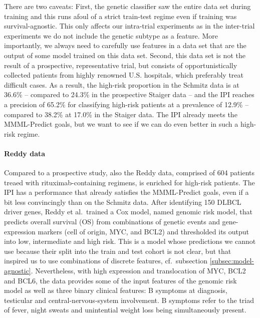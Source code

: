 There are two caveats: First, the genetic classifier saw the entire data set during training and 
this runs afoul of a strict train-test regime even if training was 
survival-agnostic. This only affects our intra-trial experiments as in the inter-trial experiments 
we do not include the genetic subtype as a feature. More importantly, we always need 
to carefully use features in a data set that are the output of some model trained on this data set. 
Second, this data set is not the result of a 
prospective, representative trial, but consists of opportunistically collected patients from highly renowned 
U.S. hospitals, which preferably treat 
difficult cases. As a result, the high-risk proportion in the Schmitz data is at \num{36.6}\% -- 
compared to \num{24.3}\% in the prospective Staiger data -- and the IPI reaches a precision of 
\num{65.2}\% for classifying high-risk patients at a prevalence of \num{12.9}\% -- compared to 
\num{38.2}\% at \num{17.0}\% in the Staiger data. The IPI already meets the MMML-Predict goals, 
but we want to see if we can do even better in such a high-risk regime.

\paragraph{Reddy data}

Compared to a prospective study, also the Reddy data, comprised of \num{604} patients treaed with 
rituximab-containing regimens, is enriched for high-risk patients. The 
IPI has a performance that already satisfies the MMML-Predict goals, even if a bit less 
convincingly than on the Schmitz data. After identifying \num{150} DLBCL driver genes, Reddy et al.\ 
trained a Cox model, named genomic risk model,
that predicts overall survival (OS) from combinations of genetic events and gene-expression markers 
(cell of origin, MYC, and BCL2) and thresholded its output into low, intermediate and high risk. This is a
model whose predictions we cannot use because their split into the train and test cohort is not 
clear, but that inspired us to use combinations of discrete features, cf.\ subsection 
\ref{subsec:model-agnostic}. Nevertheless, with high expression and translocation of MYC, BCL2 and 
BCL6, the data provides some of the input features of the genomic risk model as well as three binary 
clinical features: B symptoms at diagnosis, testicular and central-nervous-system involvement. B 
symptoms refer to the triad of fever, night sweats and unintential weight 
loss being simultaneously present.

